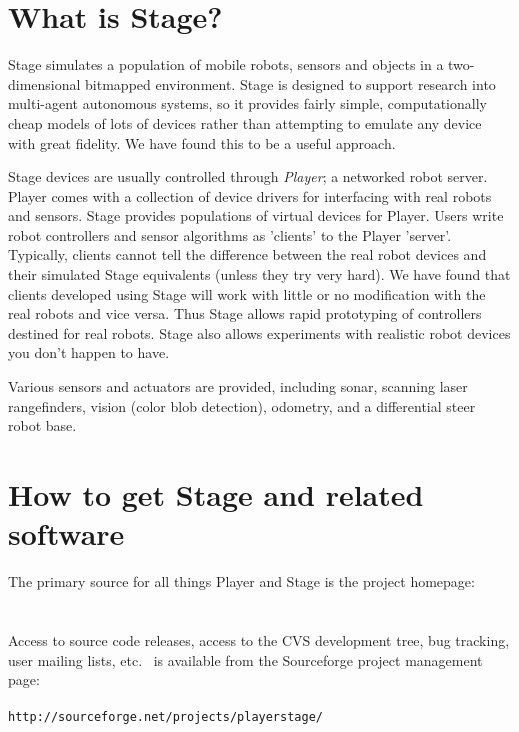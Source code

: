 \documentclass[11pt,twoside]{report}
\def\HOMEPAGE {{\tt http://playerstage.sourceforge.net}}
\def\SFPAGE {{\tt http://sourceforge.net/projects/playerstage/}}
\begin{document}
  \section{What is Stage?}

    Stage simulates a population of mobile robots, sensors and objects
    in a two-dimensional bitmapped environment. Stage is designed to
    support research into multi-agent autonomous systems, so it
    provides fairly simple, computationally cheap models of lots of
    devices rather than attempting to emulate any device with great
    fidelity. We have found this to be a useful approach.

    Stage devices are usually controlled through \emph{Player}; a
    networked robot server. Player comes with a collection of device
    drivers for interfacing with real robots and sensors. Stage
    provides populations of virtual devices for Player. Users write
    robot controllers and sensor algorithms as 'clients' to the Player
    'server'. Typically, clients cannot tell the difference between
    the real robot devices and their simulated Stage equivalents
    (unless they try very hard). We have found that clients developed
    using Stage will work with little or no modification with the real
    robots and vice versa. Thus Stage allows rapid prototyping of
    controllers destined for real robots. Stage also allows
    experiments with realistic robot devices you don't happen to have.
  
    Various sensors and actuators are provided, including sonar,
    scanning laser rangefinders, vision (color blob detection),
    odometry, and a differential steer robot base.

  \section{How to get Stage and related software}

    The primary source for all things Player and Stage is the project
    homepage:\\\\ \indent \HOMEPAGE\\	
	
   \noindent Access to source code releases, access to the CVS
   development tree, bug tracking, user mailing lists, etc.~ is
   available from the Sourceforge project management page:\\\\\indent
   \SFPAGE\\
\end{document}
